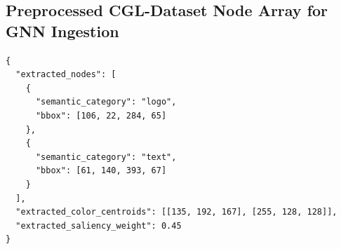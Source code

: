 \begin{theappendices}









\chapter{Preprocessed CGL-Dataset Node Array for GNN Ingestion}
\label{annex:cgl-node-array}
\begin{lstlisting}
{
  "extracted_nodes": [
    {
      "semantic_category": "logo",
      "bbox": [106, 22, 284, 65]
    },
    {
      "semantic_category": "text",
      "bbox": [61, 140, 393, 67]
    }
  ],
  "extracted_color_centroids": [[135, 192, 167], [255, 128, 128]],
  "extracted_saliency_weight": 0.45
}
\end{lstlisting}


\end{theappendices}
